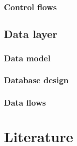 \documentclass[signature]{deltares_manual}
\begin{document}
\subsection{Control flows}
\label{subsec:controlFlows}

\section{Data layer}
\label{sec:dataLayer}

\subsection{Data model}
\label{subsec:dataModel}

\subsection{Database design}
\label{subsec:databaseDesign}

\subsection{Data flows}
\label{subsec:dataFlows}


\chapter{Literature}  \label{chapterLiterature}



\pagestyle{empty}
\mbox{}

\end{document}
